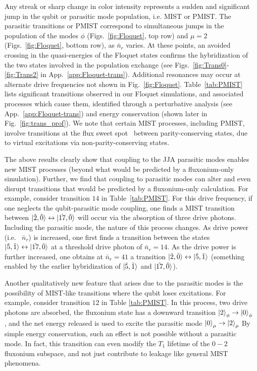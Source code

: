\documentclass[%
reprint,
superscriptaddress,
 amsmath,amssymb,
 aps,
 prx,
longbibliography,
floatfix,
]{revtex4-2}
\begin{document}
Any streak or sharp change in color intensity represents a sudden and significant jump in the qubit or parasitic mode population, i.e. MIST or PMIST. The parasitic transitions or PMIST correspond to simultaneous jumps in the population of the modes $\phi$ (Figs.~\ref{fig:Floquet}, top row) and $\mu=2$ (Figs.~\ref{fig:Floquet}, bottom row), as $\bar{n}_r$ varies. At these points, an avoided crossing in the quasi-energies of the Floquet states confirms the hybridization of the two states involved in the population exchange (see Figs.~\ref{fig:Trans0}-\ref{fig:Trans2} in App.~\ref{app:Floquet-trans}). Additional resonances may occur at alternate drive frequencies not shown in Fig.~\ref{fig:Floquet}. Table~\ref{tab:PMIST} lists significant transitions observed in our Floquet simulations, and associated processes which cause them, identified through a perturbative analysis (see App.~\ref{app:Floquet-trans}) and energy conservation (shown later in Fig.~\ref{fig:trans_prof}). We note that certain MIST processes, including PMIST, involve transitions at the flux sweet spot~\cite{zhu_circuit_2013} between parity-conserving states, due to virtual excitations via non-parity-conserving states. 

The above results clearly show that coupling to the JJA parasitic modes enables new MIST processes (beyond what would be predicted by a fluxonium-only simulation).  Further, we find that coupling to parasitic modes can alter and even disrupt transitions that would be predicted by a fluxonium-only calculation.  For example, consider transition $14$ in Table~\ref{tab:PMIST}.  For this drive frequency, if one neglects the qubit-parasitic mode coupling, one finds a MIST transition between   
$ \ket{\tilde{2},\tilde{0}} \leftrightarrow \ket{\tilde{17},\tilde{0}}$ will occur via the absorption of three drive photons.  
Including the parasitic mode, the nature of this process changes.  As drive power (i.e. ~$\bar{n}_r$) is increased, one first finds a transition between the states $\ket{\tilde{5},\tilde{1}}\leftrightarrow \ket{\tilde{17},\tilde{0}}$ at a threshold drive photon of $\bar n_r=14$. As the drive power is further increased, one obtains at $\bar n_r=41$ a transition $\ket{\tilde{2},\tilde{0}}\leftrightarrow \ket{\tilde{5},\tilde{1}}$ (something enabled by the earlier hybridization of $\ket{\tilde{5},\tilde{1}}$ 
and  $\ket{\tilde{17},\tilde{0}}$).


Another qualitatively new feature that arises due to the parasitic modes is the possibility of MIST-like transitions where the qubit loses excitations.  For example, consider transition $12$ in Table \ref{tab:PMIST}. In this process, two drive photons are absorbed, the fluxonium state has a downward transition $\ket{2}_\phi\rightarrow\ket{0}_\phi$, and the net energy released is used to excite the parasitic mode $\ket{0}_\mu\rightarrow \ket{2}_\mu$ By simple energy conservation, such an effect is not possible without a parasitic mode. In fact, this transition can even modify the $T_1$ lifetime of the $0-2$ fluxonium subspace, and not just contribute to leakage like general MIST phenomena.
\end{document}
